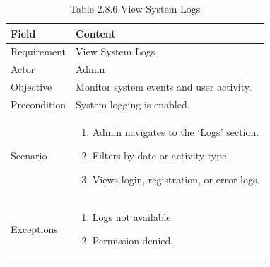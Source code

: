 \documentclass[12pt,oneside]{report}
\begin{document}
\begin{table}[H]
\centering
\caption{Table 2.8.6 View System Logs}
\label{tab:admin-view-logs}
\begin{tabularx}{\textwidth}{|p{3cm}|X|}
\hline
\textbf{Field} & \textbf{Content} \\ \hline

Requirement & View System Logs \\ \hline

Actor & Admin \\ \hline

Objective & Monitor system events and user activity. \\ \hline

Precondition & System logging is enabled. \\ \hline

Scenario &
\begin{minipage}[t]{0.75\textwidth}
\begin{enumerate}[leftmargin=*,label=\arabic*.]
\item Admin navigates to the ‘Logs’ section.
\item Filters by date or activity type.
\item Views login, registration, or error logs.
\end{enumerate}
\end{minipage} \\ \hline

Exceptions &
\begin{minipage}[t]{0.75\textwidth}
\begin{enumerate}[leftmargin=*,label=\arabic*.]
\item Logs not available.
\item Permission denied.
\end{enumerate}
\end{minipage} \\ \hline

\end{tabularx}
\end{table}
\end{document}
